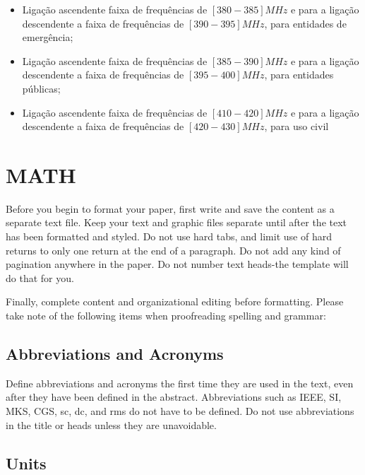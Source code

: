 \documentclass[letterpaper, 10 pt, conference]{ieeeconf}  %
\begin{document}
\begin{itemize}
    \item Ligação ascendente faixa de frequências de $[380-385]MHz$ e para a ligação descendente a faixa de frequências de $[390-395]MHz$, para entidades de emergência;
    \item Ligação ascendente faixa de frequências de $[385-390]MHz$ e para a ligação descendente a faixa de frequências de $[395-400]MHz$, para entidades públicas;
    \item Ligação ascendente faixa de frequências de $[410-420]MHz$ e para a ligação descendente a faixa de frequências de $[420-430]MHz$, para uso civil
\end{itemize}


\section{MATH}
Before you begin to format your paper, first write and save the content as a separate text file. Keep your text and graphic files separate until after the text has been formatted and styled. Do not use hard tabs, and limit use of hard returns to only one return at the end of a paragraph. Do not add any kind of pagination anywhere in the paper. Do not number text heads-the template will do that for you.

Finally, complete content and organizational editing before formatting. Please take note of the following items when proofreading spelling and grammar:

\subsection{Abbreviations and Acronyms} Define abbreviations and acronyms the first time they are used in the text, even after they have been defined in the abstract. Abbreviations such as IEEE, SI, MKS, CGS, sc, dc, and rms do not have to be defined. Do not use abbreviations in the title or heads unless they are unavoidable.

\subsection{Units}
\end{document}
